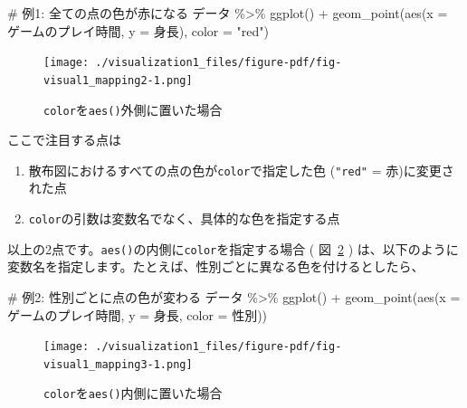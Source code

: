 \documentclass[
  a4paper,
  pandoc,
  ja=standard,
  jafont=haranoaji]{bxjsbook}
\newenvironment{Shaded}{\begin{snugshade}}{\end{snugshade}}
\newcommand{\AttributeTok}[1]{\textcolor[rgb]{0.00,0.48,0.65}{#1}}
\newcommand{\CommentTok}[1]{\textcolor[rgb]{0.37,0.37,0.37}{#1}}
\newcommand{\FunctionTok}[1]{\textcolor[rgb]{0.28,0.35,0.67}{#1}}
\newcommand{\NormalTok}[1]{\textcolor[rgb]{0.00,0.48,0.65}{#1}}
\newcommand{\SpecialCharTok}[1]{\textcolor[rgb]{0.37,0.37,0.37}{#1}}
\newcommand{\StringTok}[1]{\textcolor[rgb]{0.13,0.47,0.30}{#1}}
\providecommand{\tightlist}{%
  \setlength{\itemsep}{0pt}\setlength{\parskip}{0pt}}
\begin{document}
\begin{Shaded}
\begin{Highlighting}[numbers=left,,]
\CommentTok{\# 例1: 全ての点の色が赤になる}
\NormalTok{データ }\SpecialCharTok{\%\textgreater{}\%}
  \FunctionTok{ggplot}\NormalTok{() }\SpecialCharTok{+}
  \FunctionTok{geom\_point}\NormalTok{(}\FunctionTok{aes}\NormalTok{(}\AttributeTok{x =}\NormalTok{ ゲームのプレイ時間, }\AttributeTok{y =}\NormalTok{ 身長),}
             \AttributeTok{color =} \StringTok{"red"}\NormalTok{)}
\end{Highlighting}
\end{Shaded}

\begin{figure}

{\centering \texttt{[image: ./visualization1\_files/figure-pdf/fig-visual1\_mapping2-1.png]}

}

\caption{\label{fig-visual1_mapping2}\texttt{color}を\texttt{aes()}外側に置いた場合}

\end{figure}

ここで注目する点は

\begin{enumerate}
\def\labelenumi{\arabic{enumi}.}
\tightlist
\item
  散布図におけるすべての点の色が\texttt{color}で指定した色
  (\texttt{"red"} = 赤)に変更された点
\item
  \texttt{color}の引数は変数名でなく、具体的な色を指定する点
\end{enumerate}

以上の2点です。\texttt{aes()}の内側に\texttt{color}を指定する場合 (
図~\ref{fig-visual1_mapping3} )
は、以下のように変数名を指定します。たとえば、性別ごとに異なる色を付けるとしたら、

\begin{Shaded}
\begin{Highlighting}[numbers=left,,]
\CommentTok{\# 例2: 性別ごとに点の色が変わる}
\NormalTok{データ }\SpecialCharTok{\%\textgreater{}\%}
  \FunctionTok{ggplot}\NormalTok{() }\SpecialCharTok{+}
  \FunctionTok{geom\_point}\NormalTok{(}\FunctionTok{aes}\NormalTok{(}\AttributeTok{x =}\NormalTok{ ゲームのプレイ時間, }\AttributeTok{y =}\NormalTok{ 身長, }\AttributeTok{color =}\NormalTok{ 性別))}
\end{Highlighting}
\end{Shaded}

\begin{figure}

{\centering \texttt{[image: ./visualization1\_files/figure-pdf/fig-visual1\_mapping3-1.png]}

}

\caption{\label{fig-visual1_mapping3}\texttt{color}を\texttt{aes()}内側に置いた場合}

\end{figure}
\end{document}
